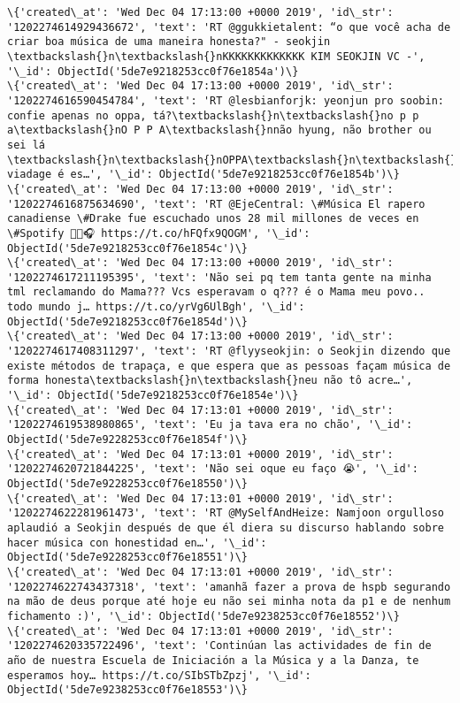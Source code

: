 \documentclass[11pt]{article}
\begin{document}
\begin{Verbatim}[commandchars=\\\{\}]
\{'created\_at': 'Wed Dec 04 17:13:00 +0000 2019', 'id\_str': '1202274614929436672', 'text': 'RT @ggukkietalent: “o que você acha de criar boa música de uma maneira honesta?" - seokjin \textbackslash{}n\textbackslash{}nKKKKKKKKKKKKK KIM SEOKJIN VC -', '\_id': ObjectId('5de7e9218253cc0f76e1854a')\}
\{'created\_at': 'Wed Dec 04 17:13:00 +0000 2019', 'id\_str': '1202274616590454784', 'text': 'RT @lesbianforjk: yeonjun pro soobin: confie apenas no oppa, tá?\textbackslash{}n\textbackslash{}no p p a\textbackslash{}nO P P A\textbackslash{}nnão hyung, não brother ou sei lá \textbackslash{}n\textbackslash{}nOPPA\textbackslash{}n\textbackslash{}nque viadage é es…', '\_id': ObjectId('5de7e9218253cc0f76e1854b')\}
\{'created\_at': 'Wed Dec 04 17:13:00 +0000 2019', 'id\_str': '1202274616875634690', 'text': 'RT @EjeCentral: \#Música El rapero canadiense \#Drake fue escuchado unos 28 mil millones de veces en \#Spotify 🎼🎤🎧 https://t.co/hFQfx9QOGM', '\_id': ObjectId('5de7e9218253cc0f76e1854c')\}
\{'created\_at': 'Wed Dec 04 17:13:00 +0000 2019', 'id\_str': '1202274617211195395', 'text': 'Não sei pq tem tanta gente na minha tml reclamando do Mama??? Vcs esperavam o q??? é o Mama meu povo.. todo mundo j… https://t.co/yrVg6UlBgh', '\_id': ObjectId('5de7e9218253cc0f76e1854d')\}
\{'created\_at': 'Wed Dec 04 17:13:00 +0000 2019', 'id\_str': '1202274617408311297', 'text': 'RT @flyyseokjin: o Seokjin dizendo que existe métodos de trapaça, e que espera que as pessoas façam música de forma honesta\textbackslash{}n\textbackslash{}neu não tô acre…', '\_id': ObjectId('5de7e9218253cc0f76e1854e')\}
\{'created\_at': 'Wed Dec 04 17:13:01 +0000 2019', 'id\_str': '1202274619538980865', 'text': 'Eu ja tava era no chão', '\_id': ObjectId('5de7e9228253cc0f76e1854f')\}
\{'created\_at': 'Wed Dec 04 17:13:01 +0000 2019', 'id\_str': '1202274620721844225', 'text': 'Não sei oque eu faço 😭', '\_id': ObjectId('5de7e9228253cc0f76e18550')\}
\{'created\_at': 'Wed Dec 04 17:13:01 +0000 2019', 'id\_str': '1202274622281961473', 'text': 'RT @MySelfAndHeize: Namjoon orgulloso aplaudió a Seokjin después de que él diera su discurso hablando sobre hacer música con honestidad en…', '\_id': ObjectId('5de7e9228253cc0f76e18551')\}
\{'created\_at': 'Wed Dec 04 17:13:01 +0000 2019', 'id\_str': '1202274622743437318', 'text': 'amanhã fazer a prova de hspb segurando na mão de deus porque até hoje eu não sei minha nota da p1 e de nenhum fichamento :)', '\_id': ObjectId('5de7e9238253cc0f76e18552')\}
\{'created\_at': 'Wed Dec 04 17:13:01 +0000 2019', 'id\_str': '1202274620335722496', 'text': 'Continúan las actividades de fin de año de nuestra Escuela de Iniciación a la Música y a la Danza, te esperamos hoy… https://t.co/SIbSTbZpzj', '\_id': ObjectId('5de7e9238253cc0f76e18553')\}

\end{Verbatim}
\end{document}
